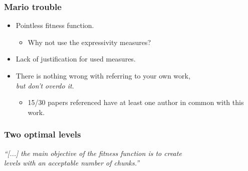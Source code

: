 \documentclass{beamer}
\begin{document}
\begin{frame}
\frametitle{Mario trouble}
\begin{itemize}
\item Pointless fitness function.
\begin{itemize}
	\item Why not use the expressivity measures?
\end{itemize}
\item Lack of justification for used measures.
\item There is nothing wrong with referring to your own work, \\\textit{but don't overdo it}.
\begin{itemize}
\item 15/30 papers referenced have at least one author in common with this work.
\end{itemize}
\end{itemize}
\end{frame}

\begin{frame}
\frametitle{Two optimal levels}

\bigskip

\textit{``[...] the main objective of the fitness function is to create 
\\levels with an acceptable number of chunks.''} \cite{galvan2010evolving}
\end{frame}
\end{document}
